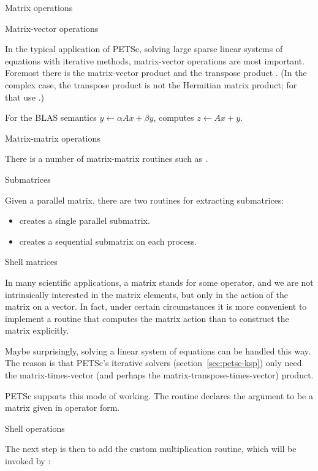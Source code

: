  {Matrix operations}

 {Matrix-vector operations}

In the typical application of PETSc, solving large sparse linear
systems of equations with iterative methods, matrix-vector operations
are most important. Foremost there is the matrix-vector product
 and the transpose product
.
(In the complex case, the transpose product is not the Hermitian
matrix product; for that use .)

For the \ac{BLAS}  semantics
$y\leftarrow \alpha Ax + \beta y$,
 computes
$z\leftarrow Ax +y $.

 {Matrix-matrix operations}

There is a number of matrix-matrix routines such as
.

 {Submatrices}
\label{sec:petsc-submat}

Given a parallel matrix, there are two routines for extracting submatrices:
\begin{itemize}
\item {} creates a single parallel
  submatrix.
\item {} creates a sequential
  submatrix on each process.
\end{itemize}

 {Shell matrices}
\label{sec:mat-shell}

In many scientific applications, a matrix stands for some operator,
and we are not intrinsically interested in the matrix elements, but
only in the action of the matrix on a vector. In fact, under certain
circumstances it is more convenient to implement a routine that
computes the matrix action than to construct the matrix explicitly.

Maybe surprisingly, solving a linear system of equations can be
handled this way. The reason is that PETSc's iterative solvers
(section~\ref{sec:petsc-ksp}) only need the matrix-times-vector (and perhaps
the matrix-transpose-times-vector) product.

PETSc supports this mode of working. The routine 
declares the argument to be a matrix given in operator form.

 {Shell operations}

The next step is then to add the custom multiplication routine, which
will be invoked by :
%

